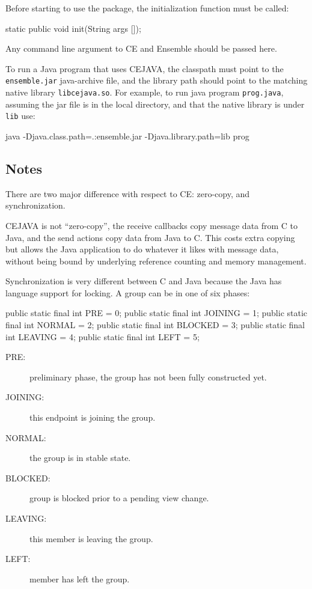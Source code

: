 Before starting to use the package, the initialization function must
be called: 

\begin{codebox}
    static public void init(String args []);
\end{codebox}

Any command line argument to CE and Ensemble should be passed here. 

To run a Java program that uses CEJAVA, the classpath must point to
the {\tt ensemble.jar} java-archive file, and the library path should
point to the matching native library {\tt libcejava.so}. For example,
to run java program {\tt prog.java}, assuming the jar file is in the
local directory, and that the native library is under {\tt lib} use:
\begin{codebox}
    java -Djava.class.path=.:ensemble.jar -Djava.library.path=lib prog
\end{codebox}

\subsection{Notes}
There are two major difference with respect to CE: zero-copy, and
synchronization. 

CEJAVA is not ``zero-copy'', the receive callbacks copy message data
from C to Java, and the send actions copy data from Java to C. This
costs extra copying but allows the Java application to do whatever it
likes with message data, without being bound by underlying reference
counting and memory management. 

Synchronization is very different between C and Java because the Java
has language support for locking. A group can be in one of six phases: 
\begin{codebox}
    public static final int PRE     = 0;
    public static final int JOINING = 1;
    public static final int NORMAL  = 2;
    public static final int BLOCKED = 3;
    public static final int LEAVING = 4;
    public static final int LEFT    = 5;
\end{codebox}

\begin{description}
\item[PRE:] preliminary phase, the group has not been fully
  constructed yet. 
\item[JOINING:] this endpoint is joining the group. 
\item[NORMAL:] the group is in stable state. 
\item[BLOCKED:] group is blocked prior to a pending view change. 
\item[LEAVING:] this member is leaving the group. 
\item[LEFT:] member has left the group. 
\end{description}

